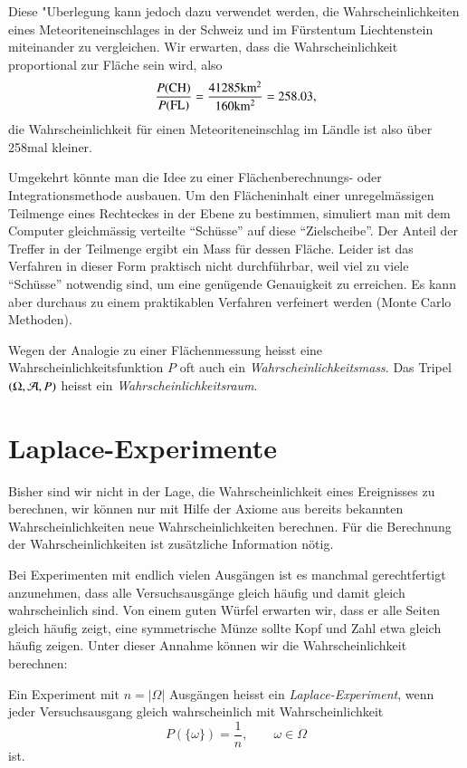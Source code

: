 Diese
"Uberlegung kann jedoch dazu verwendet werden, die Wahrscheinlichkeiten
eines Meteoriteneinschlages in der Schweiz und im Fürstentum Liechtenstein
miteinander zu vergleichen.
Wir erwarten, dass die Wahrscheinlichkeit
proportional zur Fläche sein wird, also
\[
\frac{P(\text{CH})}{P(\text{FL})}=
\frac{41285\text{km$\mathstrut^2$}}{160\text{km$\mathstrut^2$}}
=258.03,
\]
die Wahrscheinlichkeit für einen Meteoriteneinschlag im Ländle ist also
über 258mal kleiner.

Umgekehrt könnte man die Idee zu einer Flächenberechnungs- oder
Integra\-tions\-methode ausbauen.
Um den Flächeninhalt einer unregelmässigen
Teilmenge
eines Rechteckes in der Ebene zu bestimmen, simuliert man mit dem
Computer gleichmässig verteilte ``Schüsse'' auf diese ``Zielscheibe''.
Der Anteil der Treffer in der Teilmenge ergibt ein Mass für dessen
Fläche.
Leider ist das Verfahren in dieser Form praktisch nicht
durchführbar, weil viel zu viele ``Schüsse'' notwendig sind, um
eine genügende Genauigkeit zu erreichen.
Es kann aber durchaus
zu einem praktikablen Verfahren verfeinert werden (Monte Carlo Methoden).

Wegen
der Analogie zu einer Flächenmessung heisst eine
Wahrscheinlichkeitsfunktion $P$ oft auch ein {\em Wahrscheinlichkeitsmass}.
Das Tripel $(\Omega,{\cal A}, P)$ heisst ein {\em Wahrscheinlichkeitsraum}.

\section{Laplace-Experimente} \label{section-laplace-ereignisse}
Bisher sind wir nicht in der Lage, die Wahrscheinlichkeit eines Ereignisses
zu berechnen, wir können nur mit Hilfe der Axiome aus bereits bekannten
Wahrscheinlichkeiten neue Wahrscheinlichkeiten berechnen.
Für die Berechnung der Wahrscheinlichkeiten ist zusätzliche
Information nötig.

Bei Experimenten mit endlich vielen Ausgängen ist es manchmal gerechtfertigt
anzunehmen, dass alle Versuchsausgänge gleich häufig und damit gleich
wahrscheinlich sind.
Von einem guten Würfel erwarten wir, dass er alle Seiten gleich häufig
zeigt, eine symmetrische Münze sollte Kopf und Zahl etwa gleich häufig
zeigen.
Unter dieser Annahme können wir die Wahrscheinlichkeit berechnen:

\begin{definition}
Ein Experiment mit $n=|\Omega|$ Ausgängen heisst ein {\em Laplace-Experiment},
wenn jeder Versuchsausgang gleich wahrscheinlich mit Wahrscheinlichkeit
\[
P(\{\omega\})=\frac1n,\qquad\omega\in\Omega
\]
ist.
\end{definition}

